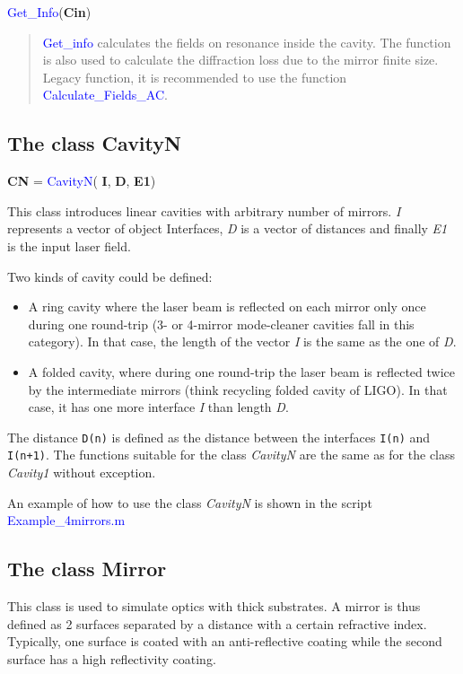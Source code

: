 \noindent \textcolor{blue}{Get\_Info}(\textbf{Cin})
\vspace*{-0.2cm}
\begin{quote}
\textcolor{blue}{Get\_info} calculates the fields on resonance inside the cavity. The function is also used to calculate the diffraction loss due to the mirror finite size. Legacy function, it is recommended to use the function \textcolor{blue}{Calculate\_Fields\_AC}.
\end{quote}



\subsection{The class CavityN}

\textbf{CN} = \textcolor{blue}{CavityN}( \textbf{I}, \textbf{D}, \textbf{E1})

This class introduces linear cavities with arbitrary number of mirrors. \textsl{I} represents a vector of object Interfaces, \textsl{D} is a vector of distances and finally \textsl{E1} is the input laser field.

Two kinds of cavity could be defined:
\begin{itemize}
  \item A ring cavity where the laser beam is reflected on each mirror only once during one round-trip (3- or 4-mirror mode-cleaner cavities fall in this category). In that case, the length of the vector \textsl{I} is the same as the one of \textsl{D}.
  \item A folded cavity, where during one round-trip the laser beam is reflected twice by the intermediate mirrors (think recycling folded cavity of LIGO). In that case, it has one more interface \textsl{I} than length \textsl{D}.
\end{itemize}


The distance  \verb|D(n)| is defined as the distance between the interfaces  \verb|I(n)| and  \verb|I(n+1)|. The functions suitable for the class \textsl{CavityN} are the same as for the class \textsl{Cavity1} without exception.

An example of how to use the class \textsl{CavityN} is shown in the script \textcolor{blue}{Example\_4mirrors.m}

\subsection{The class Mirror}

This class is used to simulate optics with thick substrates. A mirror is thus defined as 2 surfaces separated by a distance with a certain refractive index. Typically, one surface is coated with an anti-reflective coating while the second surface has a high reflectivity coating.

